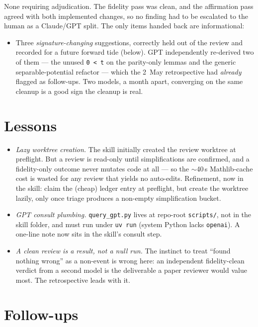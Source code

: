 \documentclass[11pt]{article}
\begin{document}
None requiring adjudication. The fidelity pass was clean, and the affirmation pass
agreed with both implemented changes, so no finding had to be escalated to the
human as a Claude/GPT split. The only items handed back are informational:

\begin{itemize}[nosep]
\item Three \emph{signature-changing} suggestions, correctly held out of the review
  and recorded for a future forward tide (below). GPT independently re-derived two
  of them --- the unused \texttt{0 < t} on the parity-only lemmas and the generic
  separable-potential refactor --- which the 2~May retrospective had \emph{already}
  flagged as follow-ups. Two models, a month apart, converging on the same cleanup
  is a good sign the cleanup is real.
\end{itemize}

\section{Lessons}

\begin{itemize}
\item \emph{Lazy worktree creation.} The skill initially created the review
  worktree at preflight. But a review is read-only until simplifications are
  confirmed, and a fidelity-only outcome never mutates code at all --- so the
  $\sim$40\,s Mathlib-cache cost is wasted for any review that yields no auto-edits.
  Refinement, now in the skill: claim the (cheap) ledger entry at preflight, but
  create the worktree lazily, only once triage produces a non-empty simplification
  bucket.
\item \emph{GPT consult plumbing.} \texttt{query\_gpt.py} lives at repo-root
  \texttt{scripts/}, not in the skill folder, and must run under \texttt{uv run}
  (system Python lacks \texttt{openai}). A one-line note now sits in the skill's
  consult step.
\item \emph{A clean review is a result, not a null run.} The instinct to treat
  ``found nothing wrong'' as a non-event is wrong here: an independent
  fidelity-clean verdict from a second model is the deliverable a paper reviewer
  would value most. The retrospective leads with it.
\end{itemize}

\section{Follow-ups}
\end{document}
